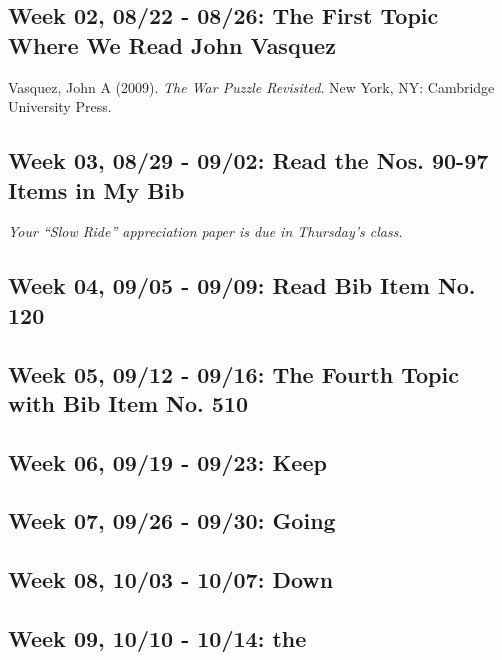 \documentclass[11pt,]{article}
\begin{document}
\subsection{Week 02, 08/22 - 08/26: The First Topic Where We Read John
Vasquez}\label{week-02-0822---0826-the-first-topic-where-we-read-john-vasquez}

Vasquez, John A (2009). \emph{The War Puzzle Revisited}. New York, NY:
Cambridge University Press.

\subsection{Week 03, 08/29 - 09/02: Read the Nos. 90-97 Items in My
Bib}\label{week-03-0829---0902-read-the-nos.-90-97-items-in-my-bib}

\emph{Your ``Slow Ride'' appreciation paper is due in Thursday's class}.

\subsection{Week 04, 09/05 - 09/09: Read Bib Item No.
120}\label{week-04-0905---0909-read-bib-item-no.-120}

\subsection{Week 05, 09/12 - 09/16: The Fourth Topic with Bib Item No.
510}\label{week-05-0912---0916-the-fourth-topic-with-bib-item-no.-510}

\subsection{Week 06, 09/19 - 09/23:
Keep}\label{week-06-0919---0923-keep}

\subsection{Week 07, 09/26 - 09/30:
Going}\label{week-07-0926---0930-going}

\subsection{Week 08, 10/03 - 10/07:
Down}\label{week-08-1003---1007-down}

\subsection{Week 09, 10/10 - 10/14: the}\label{week-09-1010---1014-the}
\end{document}
